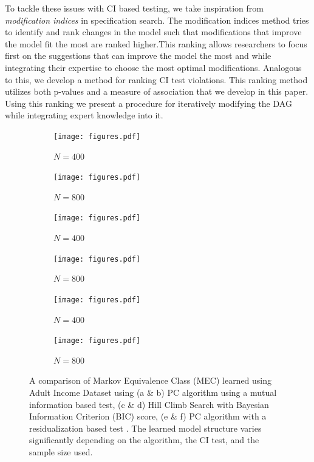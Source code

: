 \documentclass{uai2025} %
\begin{document}

To tackle these issues with CI based testing, we take inspiration from
\emph{modification indices} in specification search. The modification indices
method tries to identify and rank changes in the model such that modifications
that improve the model fit the most are ranked higher.This ranking allows
researchers to focus first on the suggestions that can improve the model the
most and while integrating their expertise to choose the most optimal
modifications. Analogous to this, we develop a method for ranking CI test
violations. This ranking method utilizes both p-values and a measure of
association that we develop in this paper. Using this ranking we present a
procedure for iteratively modifying the DAG while integrating expert knowledge
into it.

\begin{figure}
\begin{subfigure}{0.25 \textwidth}
	\texttt{[image: figures.pdf]}
	\caption{$ N = 400 $}
\end{subfigure}%
\begin{subfigure}{0.25 \textwidth}
	\texttt{[image: figures.pdf]}
	\caption{$ N = 800$ }
\end{subfigure}
\begin{subfigure}{0.25 \textwidth}
	\texttt{[image: figures.pdf]}
	\caption{$ N = 400 $ }
\end{subfigure}%
\begin{subfigure}{0.25\textwidth}
	\texttt{[image: figures.pdf]}
	\caption{ $ N = 800$ }
\end{subfigure}
\begin{subfigure}{0.25 \textwidth}
	\texttt{[image: figures.pdf]}
	\caption{ $ N = 400$ }
\end{subfigure}%
\begin{subfigure}{0.25\textwidth}
	\texttt{[image: figures.pdf]}
	\caption{$ N = 800$ }
\end{subfigure}

\caption{A comparison of Markov Equivalence Class (MEC) learned using Adult Income Dataset \citep{Becker1996} using (a \& b) PC algorithm using a mutual information based test, (c \& d) Hill Climb Search with Bayesian Information Criterion (BIC) score, (e \& f) PC algorithm with a residualization based test \citep{Ankan2023}. The learned model structure varies significantly depending on the algorithm, the CI test, and the sample size used.}
\label{fig:intro}
\end{figure}
\end{document}
